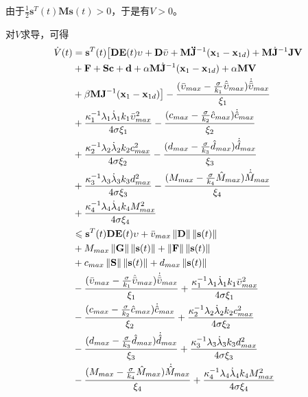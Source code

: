 由于$\frac{1}{2}\mathbf{s}^T(t)\mathbf{M}\mathbf{s}(t)>0$，于是有$V>0$。

对$V$求导，可得
\begin{align}
	\dot{V}(t)&=\mathbf{s}^T(t)\big[\mathbf{D}\mathbf{E}(t)\upsilon+\mathbf{D}\bar{\upsilon}+\mathbf{M}\mathbf{\ddot{\mathbf{J}}}^{-1}(\mathbf{x}_1-\mathbf{x}_{1d})+\mathbf{M}\dot{\mathbf{J}}^{-1}\mathbf{JV} \nonumber
	\\&+\mathbf{F+Sc+d}+\alpha\mathbf{M}\dot{\mathbf{J}}^{-1}(\mathbf{x}_1-\mathbf{x}_{1d})+\alpha\mathbf{MV} \nonumber
	\\&+\beta\mathbf{MJ}^{-1}(\mathbf{x}_1-\mathbf{x}_{1d})\big]-\frac{(\bar{\upsilon}_{max}-\frac{\sigma}{k_1}\hat{\bar{\upsilon}}_{max})\dot{\hat{\bar{\upsilon}}}_{max}}{\xi_1} \nonumber
	\\&+\frac{\kappa_1^{-1}\lambda_1\dot{\lambda}_1k_1\bar{\upsilon}_{max}^2}{4\sigma\xi_1}	-\frac{(c_{max}-\frac{\sigma}{k_2}\hat{c}_{max})\dot{\hat{c}}_{max}}{\xi_2} \nonumber
	\\&+\frac{\kappa_2^{-1}\lambda_2\dot{\lambda}_2k_2c_{max}^2}{4\sigma\xi_2}
	-\frac{(d_{max}-\frac{\sigma}{k_3}\hat{d}_{max})\dot{\hat{d}}_{max}}{\xi_3} \nonumber
	\\&+\frac{\kappa_3^{-1}\lambda_3\dot{\lambda}_3k_3d_{max}^2}{4\sigma\xi_3}
	-\frac{(M_{max}-\frac{\sigma}{k_4}\hat{M}_{max})\dot{\hat{M}}_{max}}{\xi_4} \nonumber
	\\&+\frac{\kappa_4^{-1}\lambda_4\dot{\lambda}_4k_4M_{max}^2}{4\sigma\xi_4} \nonumber
	\\&\leqslant\mathbf{s}^T(t)\mathbf{D}\mathbf{E}(t)\mathbf{\upsilon}+\bar{v}_{max}\left\lVert\mathbf{D}\right\rVert\left\lVert\mathbf{s}(t)\right\rVert \nonumber
	\\&+M_{max}\left\lVert\mathbf{G}\right\rVert\left\lVert\mathbf{s}(t)\right\rVert
	+\left\lVert\mathbf{F}\right\rVert\left\lVert\mathbf{s}(t)\right\rVert \nonumber
	\\&+c_{max}\left\lVert\mathbf{S}\right\rVert\left\lVert\mathbf{s}(t)\right\rVert+d_{max}\left\lVert\mathbf{s}(t)\right\rVert \nonumber
	\\&-\frac{(\bar{\upsilon}_{max}-\frac{\sigma}{k_1}\hat{\bar{\upsilon}}_{max})\dot{\hat{\bar{\upsilon}}}_{max}}{\xi_1}
	+\frac{\kappa_1^{-1}\lambda_1\dot{\lambda}_1k_1\bar{\upsilon}_{max}^2}{4\sigma\xi_1} \nonumber
	\\&-\frac{(c_{max}-\frac{\sigma}{k_2}\hat{c}_{max})\dot{\hat{c}}_{max}}{\xi_2}
	+\frac{\kappa_2^{-1}\lambda_2\dot{\lambda}_2k_2c_{max}^2}{4\sigma\xi_2} \nonumber
	\\&-\frac{(d_{max}-\frac{\sigma}{k_3}\hat{d}_{max})\dot{\hat{d}}_{max}}{\xi_3}
	+\frac{\kappa_3^{-1}\lambda_3\dot{\lambda}_3k_3d_{max}^2}{4\sigma\xi_3} \nonumber
	\\&-\frac{(M_{max}-\frac{\sigma}{k_4}\hat{M}_{max})\dot{\hat{M}}_{max}}{\xi_4}
	+\frac{\kappa_4^{-1}\lambda_4\dot{\lambda}_4k_4M_{max}^2}{4\sigma\xi_4}  \label{eq:mediumprocedure}
\end{align}

